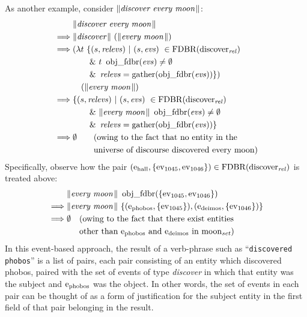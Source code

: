 \documentclass[../main.tex]{subfiles}
\begin{document}
\begin{refsection}
As another example, consider $\lVert\textit{discover every moon\hspace{0.1em}}\rVert$:
\begin{equation*}
	\begin{split}
		& \meaningof{discover every moon} \\
		\implies & \meaningof{discover}\ (\meaningof{every moon}) \\
		\implies & (\lambda t\ \{(s, \opit{relevs})\ |\ (s, \evs)\ \in \FDBR{\relation{\discover}}\ \\
		& \qquad \&\ t\ \objfdbr{\evs} \neq \emptyset  \\
		& \qquad \&\ \opit{relevs} = \gatherevs{\objfdbr{\evs}}\})\ \\
		& \quad (\meaningof{every moon}) \\
		\implies & \{(s, \opit{relevs})\ |\ (s, \evs)\ \in \FDBR{\relation{\discover}}\ \\
		& \qquad \&\ \meaningof{every moon}\ \objfdbr{\evs} \neq \emptyset \\
		& \qquad \&\ \opit{relevs} = \gatherevs{\objfdbr{\evs}} \} \\
		\implies & \emptyset \qquad(\dmathrm{owing to the fact that no entity in the} \\
		\phantom{\implies} & \phantom{\emptyset} \qquad \dmathrm{universe of discourse discovered every moon})
	\end{split}
\end{equation*}
Specifically, observe how the pair $(\mathrm{e}_{\operatorname{\operatorname{hall}}}, \{ \operatorname{ev}_{1045}, \operatorname{ev}_{1046} \}) \in \operatorname{FDBR}({\operatorname{\operatorname{discover}}_{\operatorname{\mathit{rel}}}})$ is treated above:
\begin{equation*}
	\begin{split}
		&\meaningof{every moon}\ \objfdbr{\{\eventassoc{1045}, \eventassoc{1046}\}} \\
		\implies & \meaningof{every moon}\ \{(\entityassoc{phobos}, \{\eventassoc{1045}\}), (\entityassoc{deimos}, \{\eventassoc{1046}\})\} \\
		\implies & \emptyset \quad (\dmathrm{owing to the fact that there exist entities}\ \\
		\phantom{\implies}	& \phantom{\emptyset} \quad \dmathrm{other than $\entity{phobos}$ and\ $\entity{deimos}$ in\ $\wordset{moon}$})
	\end{split}
\end{equation*}
In this event-based approach, the result of a verb-phrase such as ``\texttt{discovered phobos}'' is a list
of pairs, each pair consisting of an entity which discovered phobos, paired with the set of events of
type {\em discover} in which that entity was the subject and $\mathrm{e}_{\operatorname{phobos}}$ was the object.
In other words, the set of events in each pair can be thought of as a form of justification for the subject entity in the first field of that pair belonging in the result.


\end{refsection}
\end{document}
